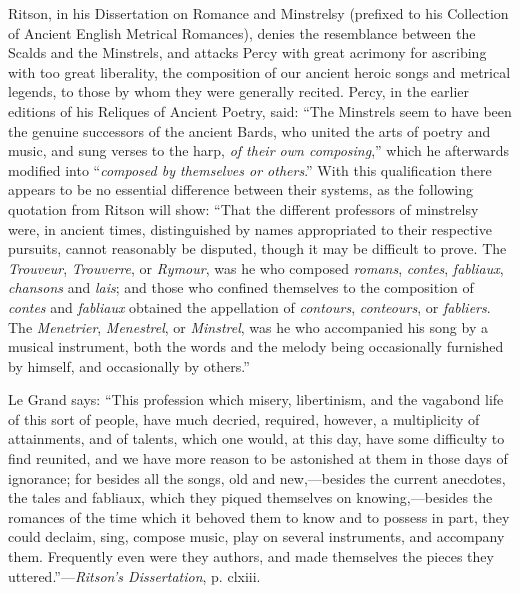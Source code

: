 Ritson, in his Dissertation on Romance and Minstrelsy (prefixed to his Collection
of Ancient English Metrical Romances), denies the resemblance between
the Scalds and the Minstrels, and attacks Percy with great acrimony for ascribing
with too great liberality, the composition of our ancient heroic songs
and metrical legends, to those by whom they were generally recited. Percy,
in the earlier editions of his Reliques of Ancient Poetry, said: “The Minstrels
seem to have been the genuine successors of the ancient Bards, who united the
arts of poetry and music, and sung verses to the harp, \textit{of their own composing},”
which he afterwards modified into “\textit{composed by themselves or others}.” With this
qualification there appears to be no essential difference between their systems, as
the following quotation from Ritson will show: “That the different professors of
minstrelsy were, in ancient times, distinguished by names appropriated to their
respective pursuits, cannot reasonably be disputed, though it may be difficult to
prove. The \textit{Trouveur}, \textit{Trouverre}, or \textit{Rymour},
 was he who composed \textit{romans}, \pagebreak
\textit{contes}, \textit{fabliaux}, \textit{chansons} and \textit{lais}; and those who confined themselves to the 
composition of \textit{contes} and \textit{fabliaux} obtained the appellation of \textit{contours}, \textit{conteours}, or
\textit{fabliers}. The \textit{Menetrier}, \textit{Menestrel}, or \textit{Minstrel}, was he who accompanied his song
by a musical instrument, both the words and the melody being occasionally furnished
by himself, and occasionally by others.”


Le Grand says: “This profession which misery, libertinism, and the vaga\-bond
life of this sort of people, have much decried, required, however, a multiplicity of
attainments, and of talents, which one would, at this day, have some difficulty to
find reunited, and we have more reason to be astonished at them in those days of
ignorance; for besides all the songs, old and new,—besides the current anecdotes, 
the tales and fabliaux, which they piqued themselves on knowing,—besides
the romances of the time which it behoved them to know and to possess in part, they
could declaim, sing, compose music, play on several instruments, and accompany
them. Frequently even were they authors, and made themselves the pieces
they uttered.”—\textit{Ritson’s Dissertation}, p. clxiii.

